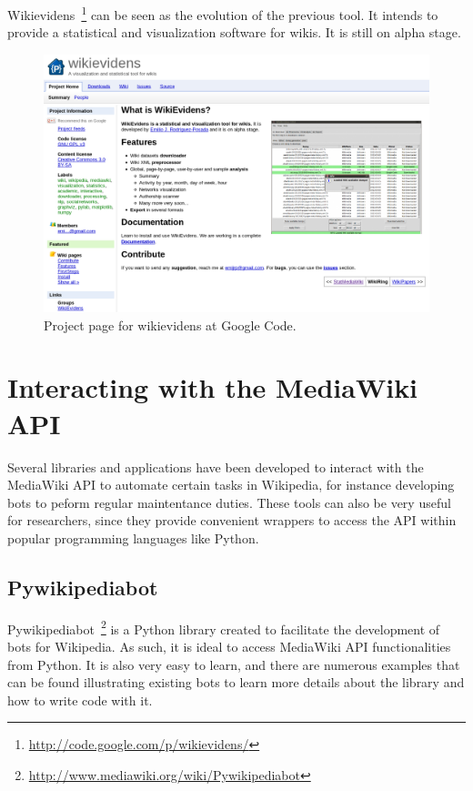 Wikievidens~\footnote{\url{http://code.google.com/p/wikievidens/}} can be 
seen as the evolution of the previous tool. It intends to provide a statistical
and visualization software for wikis. It is still on alpha stage.

\begin{figure}[h]
  \centering
    \includegraphics[width=\textwidth]{figs/wikievidens}
  \caption{Project page for wikievidens at Google Code.}
\end{figure}

\section{Interacting with the MediaWiki API}
Several libraries and applications have been developed to interact with the
MediaWiki API to automate certain tasks in Wikipedia, for instance developing bots
to peform regular maintentance duties. These tools can also be very useful for
researchers, since they provide convenient wrappers to access the API within
popular programming languages like Python.

\subsection{Pywikipediabot}
Pywikipediabot~\footnote{\url{http://www.mediawiki.org/wiki/Pywikipediabot}} is
a Python library created to facilitate the development of bots for Wikipedia.
As such, it is ideal to access MediaWiki API functionalities from Python. 
It is also very easy to learn, and there are
numerous examples that can be found illustrating existing bots to learn more
details about the library and how to write code with it.

